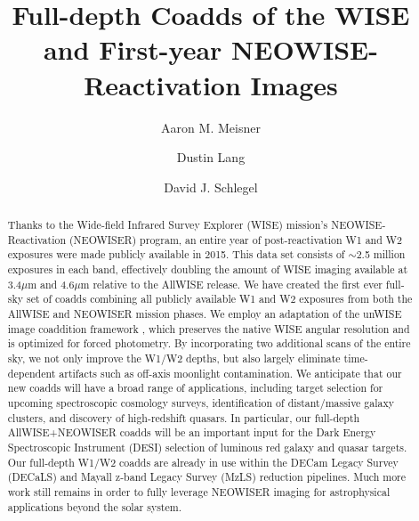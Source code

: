 \documentclass{emulateapj}
\begin{document}
 
\title{Full-depth Coadds of the WISE and First-year NEOWISE-Reactivation Images}

\author{Aaron M. Meisner}
\author{Dustin Lang}
\author{David J. Schlegel}


\begin{abstract} 
Thanks to the Wide-field Infrared Survey Explorer (WISE) mission's
NEOWISE-Reactivation (NEOWISER) program, an entire year of post-reactivation W1
and W2 exposures were made publicly available in 2015. This data set consists of
$\sim$2.5 million exposures in each band, effectively doubling the amount
of WISE imaging available at 3.4$\mu$m and 4.6$\mu$m relative to the AllWISE
release. We have created the first ever full-sky set of coadds combining all 
publicly available W1 and W2 exposures from both the AllWISE and 
NEOWISER mission phases. We employ an adaptation of the unWISE image coaddition
framework \citep{lang14}, which preserves the native WISE angular resolution 
and is optimized for forced photometry. By incorporating two additional scans
of the entire sky, we not only improve the W1/W2 depths, but also largely
eliminate time-dependent artifacts such as off-axis moonlight contamination.
We anticipate that our new coadds will have a broad range of 
applications, including target selection for upcoming spectroscopic cosmology 
surveys, identification of distant/massive galaxy clusters, and discovery
 of high-redshift quasars. In particular, our full-depth 
AllWISE+NEOWISER coadds will be an important input for the Dark Energy 
Spectroscopic Instrument (DESI) selection of luminous red galaxy and quasar 
targets. Our full-depth W1/W2 coadds are already in use within the 
DECam Legacy Survey (DECaLS) and Mayall z-band Legacy Survey (MzLS) reduction 
pipelines. Much more work still remains in order to fully leverage NEOWISER 
imaging for astrophysical applications beyond the solar system.
\end{abstract}  
 
\end{document}
